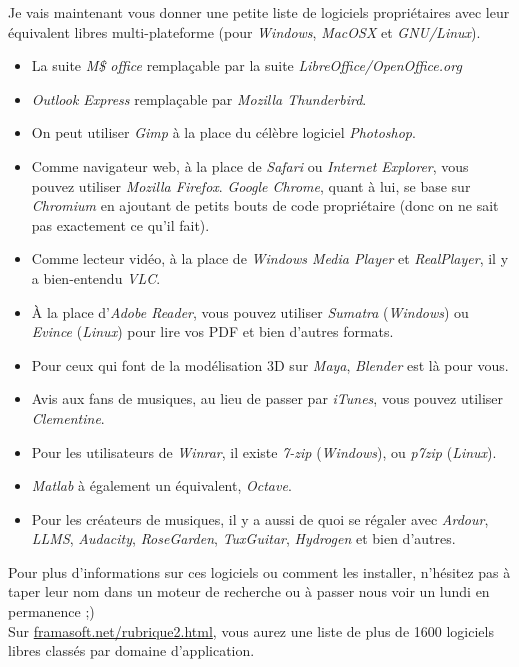 \documentclass[10pt]{../fiche}
\begin{document}
Je vais maintenant vous donner une petite liste de logiciels propriétaires avec leur équivalent libres multi-plateforme (pour \textit{Windows}, \textit{MacOSX} et \textit{GNU/Linux}). %
\begin{itemize}
	\item La suite \textit{M\$ office} remplaçable par la suite \textit{LibreOffice/OpenOffice.org}
	\item \textit{Outlook Express} remplaçable par \textit{Mozilla Thunderbird}.
	\item On peut utiliser \textit{Gimp} à la place du célèbre logiciel \textit{Photoshop}.
	\item Comme navigateur web, à la place de \textit{Safari} ou \textit{Internet Explorer}, vous pouvez utiliser \textit{Mozilla Firefox}. \textit{Google Chrome}, quant à lui, se base sur \textit{Chromium} en ajoutant de petits bouts de code propriétaire (donc on ne sait pas exactement ce qu'il fait).
	\item Comme lecteur vidéo, à la place de \textit{Windows Media Player} et \textit{RealPlayer}, il y a bien-entendu \textit{VLC}.
	\item À la place d'\textit{Adobe Reader}, vous pouvez utiliser \textit{Sumatra} (\textit{Windows}) ou \textit{Evince} (\textit{Linux}) pour lire vos PDF et bien d'autres formats. %
	\item Pour ceux qui font de la modélisation 3D sur \textit{Maya}, \textit{Blender} est là pour vous.
	\item Avis aux fans de musiques, au lieu de passer par \textit{iTunes}, vous pouvez utiliser \textit{Clementine}. %
	\item Pour les utilisateurs de \textit{Winrar}, il existe \textit{7-zip} (\textit{Windows}), ou \textit{p7zip} (\textit{Linux}).
	\item \textit{Matlab} à également un équivalent, \textit{Octave}.
	\item Pour les créateurs de musiques, il y a aussi de quoi se régaler avec \textit{Ardour}, \textit{LLMS}, \textit{Audacity}, \textit{RoseGarden}, \textit{TuxGuitar}, \textit{Hydrogen} et bien d'autres.
\end{itemize}
Pour plus d'informations sur ces logiciels ou comment les installer, n'hésitez pas à taper leur nom dans un moteur de recherche ou à passer nous voir un lundi en permanence ;)\\
Sur \url{framasoft.net/rubrique2.html}, vous aurez une liste de plus de 1600 logiciels libres classés par domaine d'application.
\end{document}
